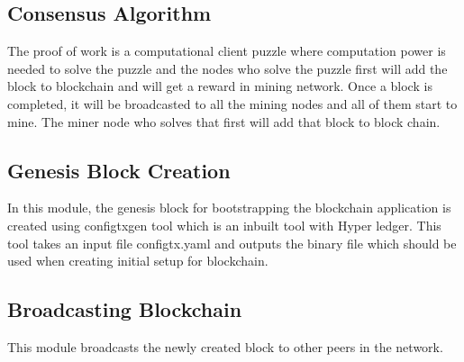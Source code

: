 \subsection{Consensus Algorithm}
The proof of work is a computational client puzzle where computation power is needed to solve the puzzle and the nodes who solve the puzzle first will add the block to blockchain and will get a reward in mining network. Once a block is completed, it will be broadcasted to all the mining nodes and all of them start to mine. The miner node who solves that first will add that block to block chain.
\subsection{Genesis Block Creation}
In this module, the genesis block for bootstrapping the blockchain application is created using configtxgen tool which is an inbuilt tool with Hyper ledger. This tool takes an input file configtx.yaml and outputs the binary file which should be used when creating initial setup for blockchain.
\subsection{Broadcasting Blockchain}
This module broadcasts the newly created block to other peers in the network.